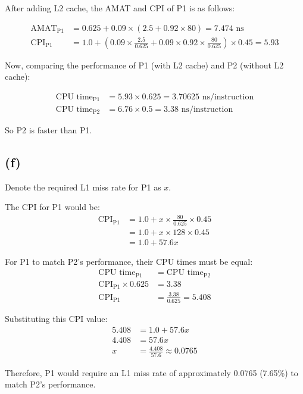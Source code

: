 \documentclass[12pt]{article}
\begin{document}
After adding L2 cache, the AMAT and CPI of P1 is as follows:

\begin{align*}
    \text{AMAT}_\text{P1} &= 0.625 + 0.09 \times (2.5 + 0.92 \times 80) = 7.474 \text{ ns} \\
    \text{CPI}_\text{P1} &= 1.0 + (0.09 \times \frac{2.5}{0.625} + 0.09 \times 0.92 \times \frac{80}{0.625}) \times 0.45 = 5.93
\end{align*}

Now, comparing the performance of P1 (with L2 cache) and P2 (without L2 cache):

\begin{align*}
    \text{CPU time}_\text{P1} &= 5.93 \times 0.625 = 3.70625 \text{ ns/instruction} \\
    \text{CPU time}_\text{P2} &= 6.76 \times 0.5 = 3.38 \text{ ns/instruction}
\end{align*}

So P2 is faster than P1.

\subsection*{(f)}

Denote the required L1 miss rate for P1 as $x$.

The CPI for P1 would be:
\begin{align*}
    \text{CPI}_\text{P1} &= 1.0 + x \times \frac{80}{0.625} \times 0.45 \\
    &= 1.0 + x \times 128 \times 0.45 \\
    &= 1.0 + 57.6x
\end{align*}

For P1 to match P2's performance, their CPU times must be equal:
\begin{align*}
    \text{CPU time}_\text{P1} &= \text{CPU time}_\text{P2} \\
    \text{CPI}_\text{P1} \times 0.625 &= 3.38 \\
    \text{CPI}_\text{P1} &= \frac{3.38}{0.625} = 5.408
\end{align*}

Substituting this CPI value:
\begin{align*}
    5.408 &= 1.0 + 57.6x \\
    4.408 &= 57.6x \\
    x &= \frac{4.408}{57.6} \approx 0.0765
\end{align*}

Therefore, P1 would require an L1 miss rate of approximately 0.0765 (7.65\%) to match P2's performance.
\end{document}
